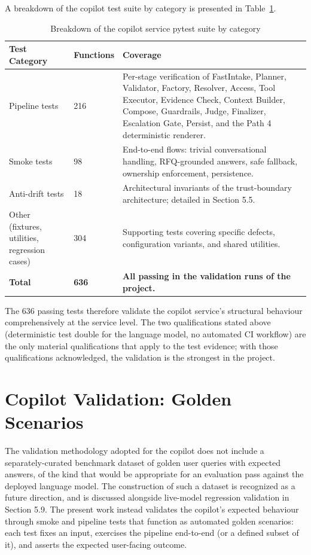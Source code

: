 A breakdown of the copilot test suite by category is presented in Table~\ref{tab:copilot_tests}.

\begin{table}[H]
\centering
\renewcommand{\arraystretch}{1.4}
\begin{tabular}{|p{4.8cm}|p{2.6cm}|p{6.1cm}|}
\hline
\rowcolor{lightgray}
\textbf{Test Category} & \textbf{Functions} & \textbf{Coverage} \\ \hline
Pipeline tests & 216 & Per-stage verification of FastIntake, Planner, Validator, Factory, Resolver, Access, Tool Executor, Evidence Check, Context Builder, Compose, Guardrails, Judge, Finalizer, Escalation Gate, Persist, and the Path 4 deterministic renderer. \\ \hline
Smoke tests & 98 & End-to-end flows: trivial conversational handling, RFQ-grounded answers, safe fallback, ownership enforcement, persistence. \\ \hline
Anti-drift tests & 18 & Architectural invariants of the trust-boundary architecture; detailed in Section 5.5. \\ \hline
Other (fixtures, utilities, regression cases) & 304 & Supporting tests covering specific defects, configuration variants, and shared utilities. \\ \hline
\textbf{Total} & \textbf{636} & \textbf{All passing in the validation runs of the project.} \\ \hline
\end{tabular}
\caption{Breakdown of the copilot service pytest suite by category}
\label{tab:copilot_tests}
\end{table}

The 636 passing tests therefore validate the copilot service's structural behaviour comprehensively at the service level. The two qualifications stated above (deterministic test double for the language model, no automated CI workflow) are the only material qualifications that apply to the test evidence; with those qualifications acknowledged, the validation is the strongest in the project.

\section{Copilot Validation: Golden Scenarios}
The validation methodology adopted for the copilot does not include a separately-curated benchmark dataset of golden user queries with expected answers, of the kind that would be appropriate for an evaluation pass against the deployed language model. The construction of such a dataset is recognized as a future direction, and is discussed alongside live-model regression validation in Section 5.9. The present work instead validates the copilot's expected behaviour through smoke and pipeline tests that function as automated golden scenarios: each test fixes an input, exercises the pipeline end-to-end (or a defined subset of it), and asserts the expected user-facing outcome.

